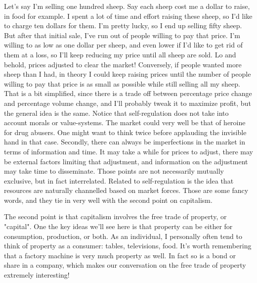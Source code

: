 \documentclass[12pt]{memoir}
\begin{document}
			Let's say I'm selling one hundred sheep. Say each sheep cost me a dollar to raise, in food for example. I spent a lot of time and effort raising these sheep, so I'd like to charge ten dollars for them. I'm pretty 
			lucky, so I end up selling fifty sheep. But after that initial sale, I've run out of people willing to pay that price. I'm willing to as low as one dollar per sheep, and even lower if I'd like to get rid of them at a loss, 
			so I'll keep reducing my price until all sheep are sold. Lo and behold, prices adjusted to clear the market! Conversely, if people wanted more sheep than I had, in theory I could keep raising prices 
			until the number of people willing to pay that price is as small as possible while still selling all my sheep. That is a bit simplified, since there is a trade off between percentage price change and 
			percentage volume change, and I'll probably tweak it to maximize profit, but the general idea is the same. Notice that self-regulation does not take into account morals or value-systems. The market could very 
			well be that of heroine for drug abusers. One might want to think twice before applauding the invisible hand in that case. Secondly, there can always be imperfections in the market in terms of information and 
			time. It may take a while for prices to adjust, there may be external factors limiting that adjustment, and  information on the adjustment may take time to disseminate. Those points are not necessarily mutually 
			exclusive, but in fact interrelated. Related to self-regulation is the idea that resources are naturally channelled based on market forces. Those are some fancy words, and they tie in very well with the second 
			point on capitalism.\
			
			The second point is that capitalism involves the free trade of property, or "capital". One the key ideas we'll see here is that property can be either for consumption, production, or both. As an individual, I 
			personally often tend to think of property as a consumer: tables, televisions, food. It's worth remembering that a factory machine is very much property as well. In fact so is a bond or share in a company, 
			which makes our conversation on the free trade of property extremely interesting!\
\end{document}
